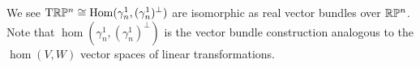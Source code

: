 \begin{theorem}[Structure]\label{thm:lec09:structure-theorem}
We see $\mathrm{T}\mathbb{R}\mathbb{P}^{n}\cong\operatorname{Hom}(\gamma_{n}^{1},(\gamma_{n}^{1})^{\perp})$
are isomorphic as real vector bundles over $\mathbb{R}\mathbb{P}^{n}$. Note that
$\hom(\gamma_{n}^{1},(\gamma_{n}^{1})^{\perp})$ is the vector bundle
construction analogous to the $\hom(V,W)$ vector spaces of linear
transformations.
\end{theorem}